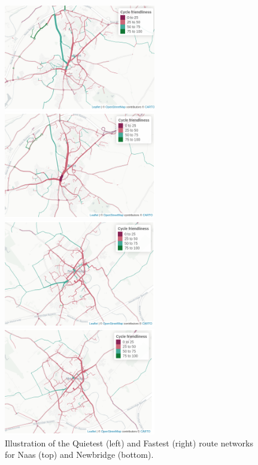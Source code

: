 \documentclass[
  super,
  preprint,
  3p]{elsarticle}
\begin{document}
\begin{figure}

\begin{minipage}{0.50\linewidth}
\includegraphics[width=2.60417in,height=\textheight]{images/naas_quietest_godutch.png}\end{minipage}%
%
\begin{minipage}{0.50\linewidth}
\includegraphics[width=2.60417in,height=\textheight]{images/naas_fastest_godutch.png}\end{minipage}%
\newline
\begin{minipage}{0.50\linewidth}
\includegraphics[width=2.60417in,height=\textheight]{images/newbridge_quietest_godutch.png}\end{minipage}%
%
\begin{minipage}{0.50\linewidth}
\includegraphics[width=2.60417in,height=\textheight]{images/newbridge_fastest_godutch.png}\end{minipage}%

\caption{\label{fig-route-types}Illustration of the Quietest (left) and
Fastest (right) route networks for Naas (top) and Newbridge (bottom).}

\end{figure}%
\end{document}
